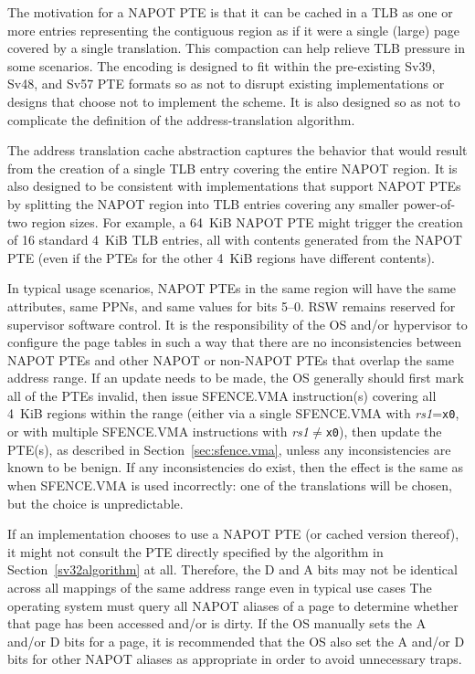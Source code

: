 \begin{commentary}
  The motivation for a NAPOT PTE is that it can be cached in a TLB as one or
  more entries representing the contiguous region as if it were a single
  (large) page covered by a single translation.  This compaction can help
  relieve TLB pressure in some scenarios.  The encoding is designed to fit
  within the pre-existing Sv39, Sv48, and Sv57 PTE formats so as not to disrupt
  existing implementations or designs that choose not to implement the scheme.
  It is also designed so as not to complicate the definition of the
  address-translation algorithm.

  The address translation cache abstraction captures the behavior that would result from the creation
  of a single TLB entry covering the entire NAPOT region.  It is also designed
  to be consistent with implementations that support NAPOT PTEs by splitting
  the NAPOT region into TLB entries covering any smaller power-of-two region
  sizes.  For example, a 64~KiB NAPOT PTE might trigger the creation of 16
  standard 4~KiB TLB entries, all with contents generated from the NAPOT PTE
  (even if the PTEs for the other 4~KiB regions have different contents).

  In typical usage scenarios, NAPOT PTEs in the same region will have the same
  attributes, same PPNs, and same values for bits 5--0.  RSW remains reserved
  for supervisor software control.  It is the responsibility of the OS and/or
  hypervisor to configure the page tables in such a way that there are no
  inconsistencies between NAPOT PTEs and other NAPOT or non-NAPOT PTEs that
  overlap the same address range.  If an update needs to be made, the OS
  generally should first mark all of the PTEs invalid, then issue SFENCE.VMA
  instruction(s) covering all 4~KiB regions within the range (either via a
  single SFENCE.VMA with {\em rs1}={\tt x0}, or with multiple SFENCE.VMA
  instructions with {\em rs1}$\neq${\tt x0}), then update the PTE(s), as
  described in Section~\ref{sec:sfence.vma}, unless any inconsistencies are
  known to be benign.  If any inconsistencies do exist, then the effect is the
  same as when SFENCE.VMA is used incorrectly: one of the translations will be
  chosen, but the choice is unpredictable.

  If an implementation chooses to use a NAPOT PTE (or cached version thereof),
  it might not consult the PTE directly specified by the algorithm in
  Section~\ref{sv32algorithm} at all.  Therefore, the D and A bits may not be
  identical across all mappings of the same address range even in typical use
  cases  The operating system must query all NAPOT aliases of a page to
  determine whether that page has been accessed and/or is dirty.  If the OS
  manually sets the A and/or D bits for a page, it is recommended that the OS
  also set the A and/or D bits for other NAPOT aliases as appropriate in order
  to avoid unnecessary traps.


\end{commentary}
